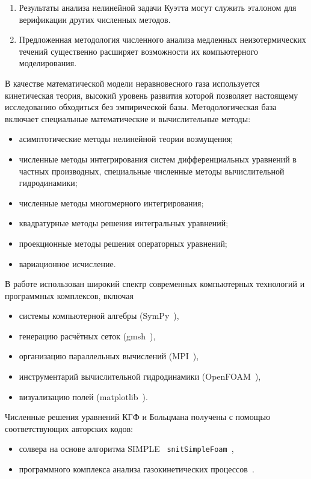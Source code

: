{\influence}
\begin{enumerate}
    \item Результаты анализа нелинейной задачи Куэтта могут служить эталоном
    для верификации других численных методов.
    \item Предложенная методология численного анализа медленных неизотермических течений
    существенно расширяет возможности их компьютерного моделирования.
\end{enumerate}

{\methods}
В качестве математической модели неравновесного газа используется кинетическая теория,
высокий уровень развития которой позволяет настоящему исследованию обходиться без эмпирической базы.
Методологическая база включает специальные математические и вычислительные методы:
\begin{itemize}
    \item асимптотические методы нелинейной теории возмущения;
    \item численные методы интегрирования систем дифференциальных уравнений в частных производных,
    специальные численные методы вычислительной гидродинамики;
    \item численные методы многомерного интегрирования;
    \item квадратурные методы решения интегральных уравнений;
    \item проекционные методы решения операторных уравнений;
    \item вариационное исчисление.
\end{itemize}
В работе использован широкий спектр современных компьютерных технологий и программных комплексов, включая
\begin{itemize}
    \item системы компьютерной алгебры (SymPy~\autocite{sympy}),
    \item генерацию расчётных сеток (gmsh~\autocite{gmsh}),
    \item организацию параллельных вычислений (MPI~\autocite{mpi}),
    \item инструментарий вычислительной гидродинамики (OpenFOAM~\autocite{openfoam}),
    \item визуализацию полей (matplotlib~\autocite{matplotlib}).
\end{itemize}
Численные решения уравнений КГФ и Больцмана получены с помощью соответствующих авторских кодов:
\begin{itemize}
    \item солвера на основе алгоритма SIMPLE~\autocite{SIMPLE}
    \verb+snitSimpleFoam+~\cite{Rogozin2014},
    \item программного комплекса анализа газокинетических процессов~\cite{Rogozin2010, Rogozin2011}.
\end{itemize}

